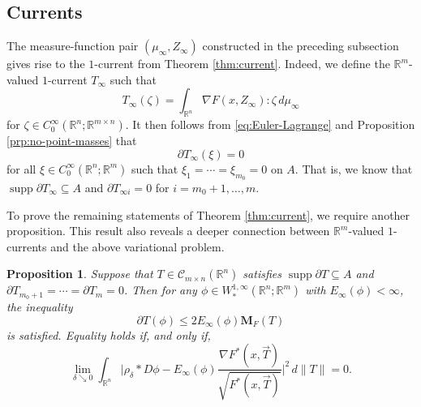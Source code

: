\documentclass[a4paper]{article}
\newcommand{\R}{\mathbb{R}}
\newcommand{\M}{\mathbf{M}}
\newcommand{\grad}{\nabla}
\newcommand{\ncrt}{\mathcal{C}}
\DeclareMathOperator{\supp}{supp}
\newtheorem{proposition}[theorem]{Proposition}
\theoremstyle{definition}
\theoremstyle{remark}
\begin{document}
\subsection{Currents} \label{sct:currents}

The measure-function pair $(\mu_\infty, Z_\infty)$ constructed in the preceding
subsection gives rise to the $1$-current from Theorem \ref{thm:current}.
Indeed, we define the $\R^m$-valued $1$-current $T_\infty$ such that
\[
T_\infty(\zeta) = \int_{\R^n} \grad F(x, Z_\infty) : \zeta \, d\mu_\infty
\]
for $\zeta \in C_0^\infty(\R^n; \R^{m \times n})$. It then follows from
\eqref{eq:Euler-Lagrange} and Proposition \ref{prp:no-point-masses} that
\[
\partial T_\infty(\xi) = 0
\]
for all $\xi \in C_0^\infty(\R^n; \R^m)$ such that
$\xi_1 = \dotsb = \xi_{m_0} = 0$ on $A$. That is, we know that
$\supp \partial T_\infty \subseteq A$ and $\partial T_{\infty i} = 0$ for
$i = m_0 + 1, \dotsc, m$.

To prove the remaining statements of Theorem \ref{thm:current}, we require
another proposition. This result also reveals a deeper connection
between $\R^m$-valued $1$-currents and the above variational problem.

\begin{proposition} \label{prp:calibration-current}
Suppose that $T \in \ncrt_{m \times n}(\R^n)$ satisfies $\supp \partial T \subseteq A$ and
$\partial T_{m_0 + 1} = \dotsb = \partial T_m = 0$.
Then for any $\phi \in W_*^{1, \infty}(\R^n; \R^m)$ with $E_\infty(\phi) < \infty$, the inequality
\[
\partial T(\phi) \le 2E_\infty(\phi) \M_F(T)
\]
is satisfied. Equality holds if, and only if,
\begin{equation} \label{eq:gradient-along-current}
\lim_{\delta \searrow 0} \int_{\R^n} \biggl|\rho_\delta * D\phi - E_\infty(\phi) \frac{\grad F^*(x, \vec{T})}{\sqrt{F^*(x, \vec{T})}}\biggr|^2 \, d\|T\| = 0.
\end{equation}
\end{proposition}
\end{document}
